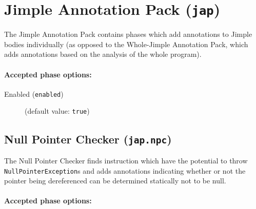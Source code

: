 \documentclass{article}
\begin{document}
\section{Jimple Annotation Pack ({\tt jap})}

The Jimple Annotation Pack contains phases which add annotations
to Jimple bodies individually (as opposed to the Whole-Jimple
Annotation Pack, which adds annotations based on the analysis of
the whole program).
                        

\paragraph{Accepted phase options:} 

\begin{description}

\item[Enabled ({\tt enabled})]
(default value: {\tt true})






\end{description}

\subsection{Null Pointer Checker ({\tt jap.npc})}

The Null Pointer Checker finds instruction which have the potential
to throw {\tt NullPointerException}s and adds annotations
indicating whether or not the pointer being dereferenced can be
determined statically not to be null.


\paragraph{Accepted phase options:} 
\end{document}
